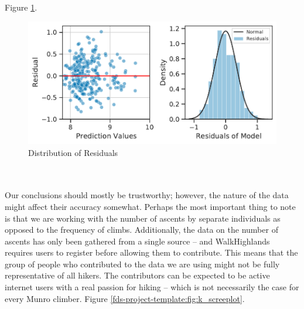 \documentclass[11pt,a4paper]{article}
\begin{document}
Figure \ref{fds-project-template:fig:multi_residuals_dist}.
\begin{figure} [h!]
  \centering
  \includegraphics{report/multi_residuals_dist.pdf}
  \caption{Distribution of Residuals}
  \label{fds-project-template:fig:multi_residuals_dist}
\end{figure} \\ \\ 
Our conclusions should mostly be trustworthy; however, the nature of the data might affect their accuracy somewhat. Perhaps the most important thing to note is that we are working with the number of ascents by separate individuals as opposed to the frequency of climbs. Additionally, the data on the number of ascents has only been gathered from a single source – and WalkHighlands requires users to register before allowing them to contribute. This means that the group of people who contributed to the data we are using might not be fully representative of all hikers. The contributors can be expected to be active internet users with a real passion for hiking – which is not necessarily the case for every Munro climber.
Figure \ref{fds-project-template:fig:k_screeplot}.
\end{document}
